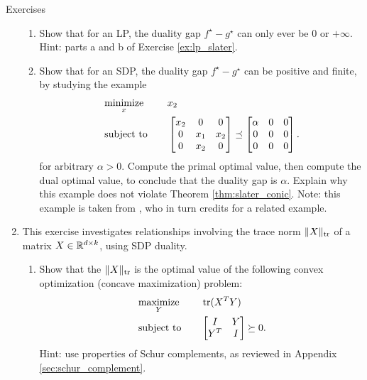 \begin{xcb}{Exercises}
\begin{enumerate}[label=\thechapter.\arabic*]
\begin{enumerate}[label=\alph*.]
\item Show that for an LP, the duality gap $f^\star - g^\star$ can only ever be
  $0$ or $+\infty$. Hint: parts a and b of Exercise \ref{ex:lp_slater}. 

\item Show that for an SDP, the duality gap $f^\star - g^\star$ can be positive
  and finite, by studying the example 
  \begin{alignat*}{2}
   &\operatorname*{minimize}_x \quad && x_2 \\
   &\operatorname{subject\,\,to} \quad && 
   \begin{bmatrix}
   x_2 & 0 & 0 \\
   0 & x_1 & x_2 \\
   0 & x_2 & 0 
 \end{bmatrix} \preceq  
 \begin{bmatrix}
  \alpha & 0 & 0 \\
  0 & 0 & 0 \\
  0 & 0 & 0 
 \end{bmatrix}.
  \end{alignat*}
  for arbitrary $\alpha > 0$. Compute the primal optimal value, then compute the
  dual optimal value, to conclude that the duality gap is $\alpha$. Explain why 
  this example does not violate Theorem \ref{thm:slater_conic}. Note: this
  example is taken from \cite{ramana1997exact}, who in turn credits
  \cite{vandenberghe1996semidefinite} for a related example.  
\end{enumerate}

\item \label{ex:trace_norm_semidefinite} 
  This exercise investigates relationships involving the trace norm
  $\|X\|_{\operatorname{tr}}$ of a matrix $X \in \mathbb{R}^{d \times k}$, using SDP duality. 

\begin{enumerate}[label=\alph*.]
\item Show that the $\|X\|_{\operatorname{tr}}$ is the optimal value of the following convex
  optimization (concave maximization) problem:
  \begin{alignat*}{2}
  &\operatorname*{maximize}_Y \quad && \operatorname{tr}(X^T Y) \\
  &\operatorname{subject\,\,to} \quad && \begin{bmatrix} I & Y \\ 
    Y^T & I \end{bmatrix} \succeq 0.
  \end{alignat*}
  Hint: use properties of Schur complements, as reviewed in Appendix
  \ref{sec:schur_complement}.


\end{enumerate}
\end{enumerate}
\end{xcb}
